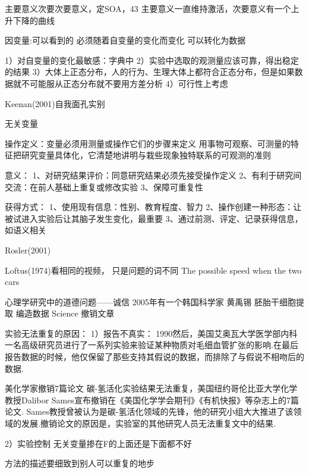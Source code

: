 主要意义次要次要意义，定SOA，43
主要意义一直维持激活，次要意义有一个上升下降的曲线


因变量:可以看到的
必须随着自变量的变化而变化
可以转化为数据

1）对自变量的变化最敏感：字典中
2）实验中选取的观测量应该可靠，得出稳定的结果
3）大体上正态分布，人的行为、生理大体上都符合正态分布，但是如果数据就不可能服从正态分布就不要用方差分析
4）可行性上考虑

Keenan(2001)自我面孔实别

无关变量

操作定义：变量必须用测量或操作它们的步骤来定义
用事物可观察、可测量的特征把研究变量具体化，它清楚地讲明与栽些现象独特联系的可观测的准则

意义：
1、对研究结果评价：同意研究结果必须先接受操作定义
2、有利于研究间交流：在前人基础上重复或修改实验
3、保障可重复性

获得方式：
1、使用现有信息：性别、教育程度、智力
2、操作创建一种形态：让被试进入实验后让其脑子发生变化，最重要
3、通过前测、评定、记录获得信息，如语义相关

Rosler(2001)

Loftus(1974)看相同的视频， 只是问题的词不同
The possible speed when the two cars

心理学研究中的道德问题——诚信
2005年有一个韩国科学家 黄禹锡 胚胎干细胞提取 编造数据 Science 撤销文章

实验无法重复的原因：
1）报告不真实：
1990然后，美国艾奥瓦大学医学部内科一名高级研究员进行了一系列实验来验证某种物质对毛细血管扩张的影响.在最后报告数据的时候，他仅保留了那些支持其假说的数据，而排除了与假说不相吻后的数据.

美化学家撤销7篇论文
碳-氢活化实验结果无法重复，美国纽约哥伦比亚大学化学教授Dalibor Sames宣布撤销在《美国化学学会期刊》《有机快报》等杂志上的7篇论文. Sames教授曾被认为是碳-氢活化领域的先锋，他的研究小组大大推进了该领域的发展.撤销论文的原因是，实验室的其他研究人员无法重复文中的结果.

2）实验控制
无关变量掺在F的上面还是下面都不好

方法的描述要细致到别人可以重复的地步







